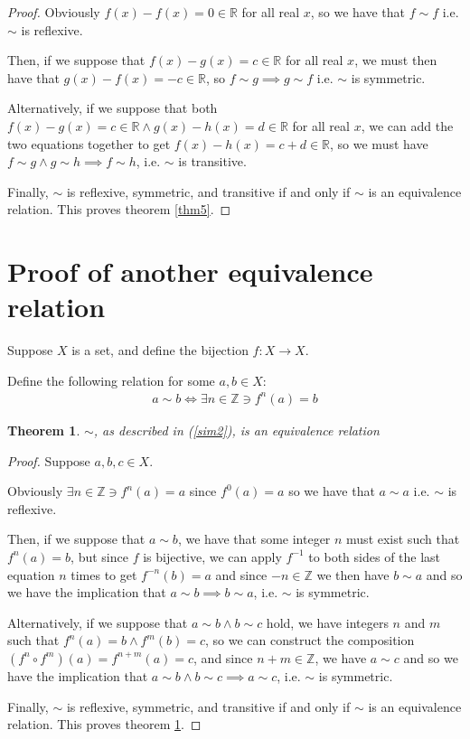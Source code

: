 \documentclass[12pt]{amsart}
\newcommand{\reals}{\mathbb{R}}
\newcommand{\ints}{\mathbb{Z}}
\newtheorem{thm}{Theorem}
\begin{document}
\begin{proof}
	Obviously $f(x) - f(x) = 0 \in \reals$
	for all real $x$,
	so we have that $f \sim f$
	i.e. $\sim$ is reflexive.

	Then, if we suppose that $f(x) - g(x) = c \in \reals$
	for all real $x$,
	we must then have
	that $g(x) - f(x) = -c \in \reals$,
	so $f \sim g \implies g \sim f$
	i.e. $\sim$ is symmetric.

	Alternatively, if we suppose that both
	$f(x) - g(x) = c \in \reals \land g(x) - h(x) = d \in \reals$
	for all real $x$,
	we can add the two equations together to get
	$f(x) - h(x) = c + d \in \reals$,
	so we must have $f \sim g \land g \sim h \implies f \sim h$,
	i.e. $\sim$ is transitive.

	Finally, $\sim$ is
	reflexive,
	symmetric,
	and transitive
	if and only if
	$\sim$ is an equivalence relation.
	This proves theorem \ref{thm5}.
\end{proof}

\section{Proof of another equivalence relation}

Suppose $X$ is a set,
and define the bijection $f:X \to X$.

Define the following relation for some $a,b \in X$:
\begin{align} \label{sim2}
	a \sim b \iff \exists n \in \ints \ni f^n(a) = b
\end{align}

\begin{thm} \label{thm6}
	$\sim$, as described in (\ref{sim2}), is an equivalence relation
\end{thm}

\begin{proof}
	Suppose $a,b,c \in X$.

	Obviously $\exists n \in \ints \ni f^n(a) = a$
	since $f^0(a) = a$
	so we have that $a \sim a$
	i.e. $\sim$ is reflexive.

	Then, if we suppose that $a \sim b$,
	we have that some integer $n$ must
	exist such that $f^n(a) = b$,
	but since $f$ is bijective, we can apply $f^{-1}$
	to both sides of the last equation $n$ times
	to get $f^{-n}(b) = a$ and since $-n \in \ints$
	we then have $b \sim a$ and so
	we have the implication that
	$a \sim b \implies b \sim a$,
	i.e. $\sim$ is symmetric.

	Alternatively, if we suppose that
	$a \sim b \land b \sim c$ hold,
	we have integers $n$ and $m$ such that
	$f^n(a) = b \land f^m(b) = c$,
	so we can construct the composition
	$(f^n \circ f^m)(a) = f^{n + m}(a) = c$,
	and since $n + m \in \ints$,
	we have $a \sim c$ and so
	we have the implication that
	$a \sim b \land b \sim c \implies a \sim c$,
	i.e. $\sim$ is symmetric.

	Finally, $\sim$ is
	reflexive,
	symmetric,
	and transitive
	if and only if
	$\sim$ is an equivalence relation.
	This proves theorem \ref{thm6}.
\end{proof}
\end{document}
